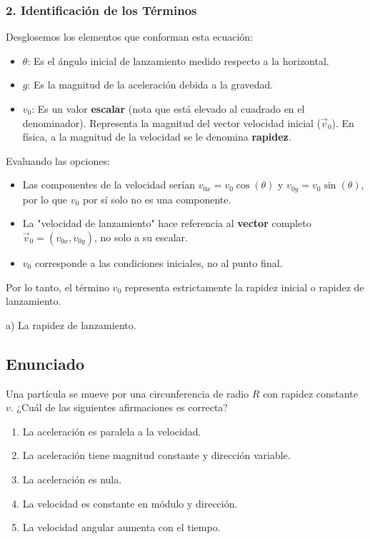 \documentclass[12pt, a4paper]{article}
\begin{document}
\subsubsection*{2. Identificación de los Términos}
Desglosemos los elementos que conforman esta ecuación:
\begin{itemize}
    \item $\theta$: Es el ángulo inicial de lanzamiento medido respecto a la horizontal.
    \item $g$: Es la magnitud de la aceleración debida a la gravedad.
    \item $v_0$: Es un valor \textbf{escalar} (nota que está elevado al cuadrado en el denominador). Representa la magnitud del vector velocidad inicial ($\vec{v}_0$). En física, a la magnitud de la velocidad se le denomina \textbf{rapidez}. 
\end{itemize}

Evaluando las opciones:
\begin{itemize}
    \item Las componentes de la velocidad serían $v_{0x} = v_0 \cos(\theta)$ y $v_{0y} = v_0 \sin(\theta)$, por lo que $v_0$ por sí solo no es una componente.
    \item La "velocidad de lanzamiento" hace referencia al \textbf{vector} completo $\vec{v}_0 = (v_{0x}, v_{0y})$, no solo a su escalar.
    \item $v_0$ corresponde a las condiciones iniciales, no al punto final.
\end{itemize}

Por lo tanto, el término $v_0$ representa estrictamente la rapidez inicial o rapidez de lanzamiento.

\begin{tcolorbox}[colback=green!5!white, colframe=green!50!black, title=Respuesta Final]
\centering \Large a) La rapidez de lanzamiento.
\end{tcolorbox}

\newpage

\subsection*{Enunciado}
Una partícula se mueve por una circunferencia de radio $R$ con rapidez constante $v$. ¿Cuál de las siguientes afirmaciones es correcta?

\begin{enumerate}[label=\alph*)]
    \item La aceleración es paralela a la velocidad.
    \item La aceleración tiene magnitud constante y dirección variable.
    \item La aceleración es nula.
    \item La velocidad es constante en módulo y dirección.
    \item La velocidad angular aumenta con el tiempo.
\end{enumerate}
\end{document}
